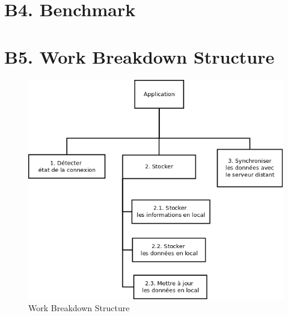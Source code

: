 \section{B4. Benchmark}

\section{B5. Work Breakdown Structure}

 \begin{figure}[H]
 \centering
  \includegraphics[width=18cm]{./images/wbs.png}
\caption{Work Breakdown Structure}
  \end{figure}
